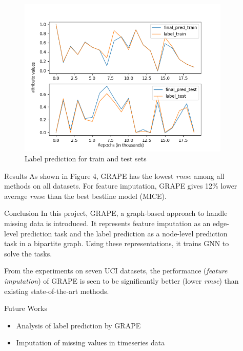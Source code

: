 \documentclass[final]{beamer}
\newlength{\sepwidth}
\newlength{\colwidth}
\newlength{\twocolwidth}
\newcommand{\separatorcolumn}{\begin{column}{\sepwidth}\end{column}}
\begin{document}
\begin{frame}[t]
\begin{columns}[t]
\begin{column}{\twocolwidth}
\begin{columns}[t, totalwidth=\twocolwidth]
\begin{column}{\colwidth}
\end{column}
\separatorcolumn
\begin{column}{\colwidth}
\vspace{-1cm}
    \begin{figure}
 	    \includegraphics[width=1\textwidth]{figures/label_test.png}
 	    \caption{Label prediction for train and test sets}
 	    \label{cdft}
    \end{figure}
  \begin{block}{Results}
As shown in Figure 4, GRAPE has the lowest \textit{rmse} among all methods on all datasets.  For feature imputation, GRAPE gives 12\% lower average \textit{rmse} than the best bestline model (MICE).
 
  \end{block}

  \begin{block}{Conclusion}
In this project, GRAPE, a graph-based approach to handle missing data is introduced. It represents feature imputation as an edge-level prediction task and the label prediction as a node-level prediction task in a bipartite graph. Using these representations, it trains GNN to solve the tasks.

From the experiments on seven UCI datasets, the performance (\textit{feature imputation}) of GRAPE is seen to be significantly better (lower \textit{rmse}) than existing state-of-the-art methods.
  
  \end{block}
\begin{block}{Future Works}

\begin{itemize}
    \item Analysis of label prediction by GRAPE
    \item Imputation of missing values in timeseries data
\end{itemize}


\end{block}
\end{column}
\end{columns}
\end{column}
\end{columns}
\end{frame}
\end{document}
